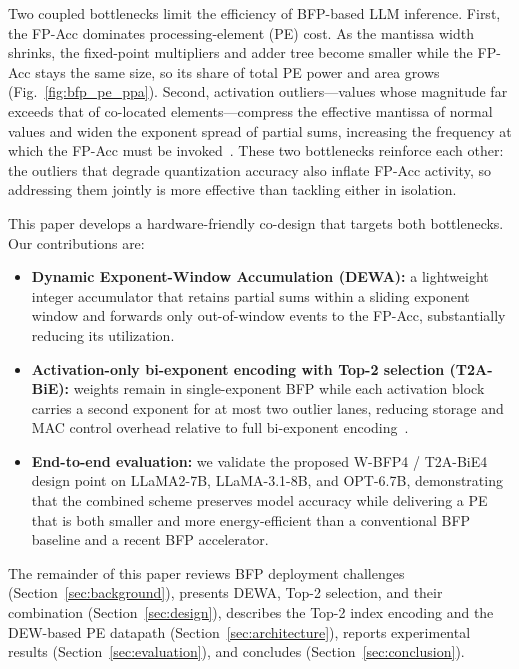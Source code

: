 Two coupled bottlenecks limit the efficiency of BFP-based LLM inference.
First, the FP-Acc dominates processing-element (PE) cost.
As the mantissa width shrinks, the fixed-point multipliers and adder tree become smaller while the FP-Acc stays the same size, so its share of total PE power and area grows (Fig.~\ref{fig:bfp_pe_ppa}).
Second, activation outliers---values whose magnitude far exceeds that of co-located elements---compress the effective mantissa of normal values and widen the exponent spread of partial sums, increasing the frequency at which the FP-Acc must be invoked~\cite{bie2024,ees2025,oiso2026,bbal2025,harmonia2026}.
These two bottlenecks reinforce each other: the outliers that degrade quantization accuracy also inflate FP-Acc activity, so addressing them jointly is more effective than tackling either in isolation.

This paper develops a hardware-friendly co-design that targets both bottlenecks.
Our contributions are:
\begin{itemize}
    \item \textbf{Dynamic Exponent-Window Accumulation (DEWA):} a lightweight integer accumulator that retains partial sums within a sliding exponent window and forwards only out-of-window events to the FP-Acc, substantially reducing its utilization.
    \item \textbf{Activation-only bi-exponent encoding with Top-2 selection (T2A-BiE):} weights remain in single-exponent BFP while each activation block carries a second exponent for at most two outlier lanes, reducing storage and MAC control overhead relative to full bi-exponent encoding~\cite{bie2024,oiso2026}.
    \item \textbf{End-to-end evaluation:} we validate the proposed W-BFP4 / T2A-BiE4 design point on LLaMA2-7B, LLaMA-3.1-8B, and OPT-6.7B, demonstrating that the combined scheme preserves model accuracy while delivering a PE that is both smaller and more energy-efficient than a conventional BFP baseline and a recent BFP accelerator.
\end{itemize}

The remainder of this paper reviews BFP deployment challenges (Section~\ref{sec:background}), presents DEWA, Top-2 selection, and their combination (Section~\ref{sec:design}), describes the Top-2 index encoding and the DEW-based PE datapath (Section~\ref{sec:architecture}), reports experimental results (Section~\ref{sec:evaluation}), and concludes (Section~\ref{sec:conclusion}).

